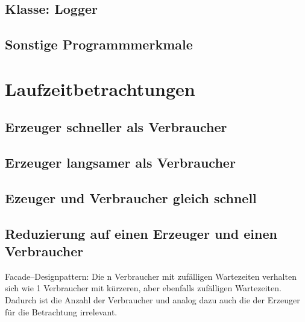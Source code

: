 \subsection{Klasse: Logger} %
\label{sub:klasse_logger}


\subsection{Sonstige Programmmerkmale} %
\label{sub:sonstige_programmmerkmale}


\newpage
\section{Laufzeitbetrachtungen} %
\label{sec:laufzeitbetrachtungen}

\subsection{Erzeuger schneller als Verbraucher} %
\label{sub:erzeuger_schneller_als_verbraucher}


\subsection{Erzeuger langsamer als Verbraucher} %
\label{sub:erzeuger_langsamer_als_verbraucher}


\subsection{Ezeuger und Verbraucher gleich schnell} %
\label{sub:ezeuger_und_verbraucher_gleich_schnell}


\subsection{Reduzierung auf einen Erzeuger und einen Verbraucher} %
\label{sub:reduzierung_auf_einen_erzeuger_und_einen_verbraucher}

Facade–Designpattern: Die n Verbraucher mit zufälligen Wartezeiten verhalten sich wie 1 Verbraucher mit kürzeren, aber ebenfalls zufälligen Wartezeiten. Dadurch ist die Anzahl der Verbraucher und analog dazu auch die der Erzeuger für die Betrachtung irrelevant.


